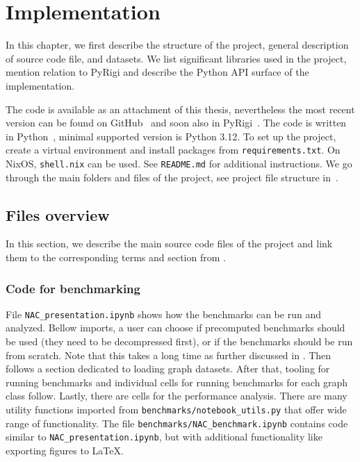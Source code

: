 
\chapter{Implementation}%
\label{chapter:impl}

\begin{chapterabstract}

	In this chapter,
	we first describe the structure of the project,
	general description of source code file, and datasets.
	We list significant libraries used in the project,
	mention relation to PyRigi and
	describe the Python API surface of the implementation.

\end{chapterabstract}

The code is available as an attachment of this thesis,
nevertheless the most recent version can be found on GitHub~\cite{my_code}
and soon also in PyRigi~\cite{pyrigi}.
%
The code is written in Python~\cite{python}, minimal supported version is Python 3.12.
To set up the project, create a virtual environment and install packages
from \texttt{requirements.txt}. On NixOS, \texttt{shell.nix} can be used.
See \texttt{README.md} for additional instructions.
We go through the main folders and files of the project,
see project file structure in~.


\section{Files overview}

In this section, we describe the main source code files of the project
and link them to the corresponding terms and section
from .

\subsection{Code for benchmarking}

File \texttt{NAC\_presentation.ipynb} shows how the benchmarks
can be run and analyzed.
Bellow imports, a user can choose if precomputed benchmarks should be used
(they need to be decompressed first),
or if the benchmarks should be run from scratch.
Note that this takes a long time
as further discussed in .
Then follows a section dedicated to loading graph datasets.
After that, tooling for running benchmarks and individual cells
for running benchmarks for each graph class follow.
Lastly, there are cells for the performance analysis.
%
There are many utility functions
imported from \texttt{benchmarks/notebook\_utils.py}
that offer wide range of functionality.
The file \texttt{benchmarks/NAC\_benchmark.ipynb}
contains code similar to \texttt{NAC\_presentation.ipynb},
but with additional functionality like exporting figures to \LaTeX{}.

